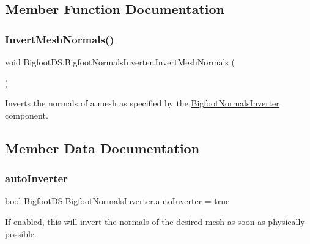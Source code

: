 \subsection{Member Function Documentation}
\mbox{\label{class_bigfoot_d_s_1_1_bigfoot_normals_inverter_aa1e69f42fcba0e36398db1e8fd7d217f}} 
\subsubsection{\texorpdfstring{Invert\+Mesh\+Normals()}{InvertMeshNormals()}}
{\footnotesize\ttfamily void Bigfoot\+D\+S.\+Bigfoot\+Normals\+Inverter.\+Invert\+Mesh\+Normals (\begin{DoxyParamCaption}{ }\end{DoxyParamCaption})}



Inverts the normals of a mesh as specified by the \mbox{\hyperlink{class_bigfoot_d_s_1_1_bigfoot_normals_inverter}{Bigfoot\+Normals\+Inverter}} component. 



\subsection{Member Data Documentation}
\mbox{\label{class_bigfoot_d_s_1_1_bigfoot_normals_inverter_aafe7464bb4afaa60822e2463d541bf77}} 
\subsubsection{\texorpdfstring{auto\+Inverter}{autoInverter}}
{\footnotesize\ttfamily bool Bigfoot\+D\+S.\+Bigfoot\+Normals\+Inverter.\+auto\+Inverter = true}



If enabled, this will invert the normals of the desired mesh as soon as physically possible. 


